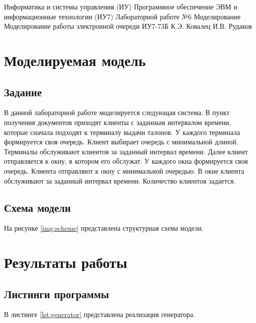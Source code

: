 \documentclass{bmstu}
\begin{document}
\makereporttitle
{Информатика и системы управления (ИУ)}
{Программное обеспечение ЭВМ и информационные технологии (ИУ7)}
{Лабораторной работе №6}
{Моделирование}
{Моделирование работы электронной очереди}
{}
{ИУ7-73Б}
{К.Э. Ковалец}
{И.В. Рудаков}


\setcounter{page}{2}
\renewcommand{\contentsname}{Содержание} 
\tableofcontents

\chapter{Моделируемая модель}

\section{Задание}

В данной лабораторной работе моделируется следующая система. В пункт получения документов приходят клиенты с заданным интервалом времени, которые сначала подходят к терминалу выдачи талонов. У каждого терминала формируется своя очередь. Клиент выбирает очередь с минимальной длиной. Терминалы обслуживают клиентов за заданный интервал времени. Далее клиент отправляется к окну, в котором его обслужат. У каждого окна формируется своя очередь. Клиента отправляют к окну с минимальной очередью. В окне клиента обслуживают за заданный интервал времени. Количество клиентов задается.

\section{Схема модели}

На рисунке \ref{img:scheme} представлена структурная схема модели.


\chapter{Результаты работы}

\section{Листинги программы}

В листинге \ref{lst:generator} представлена реализация генератора.

\end{document}
